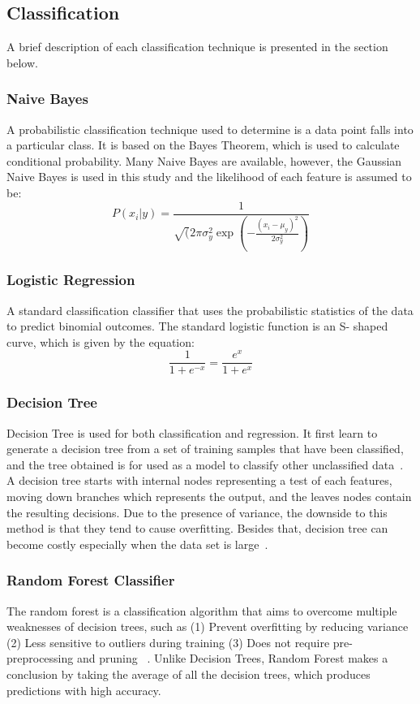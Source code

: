 \documentclass[conference]{IEEEtran}
\begin{document}
\subsection{Classification}
A brief description of each classification technique is presented in the section below.

\subsubsection{Naive Bayes}
A probabilistic classification technique used to determine is a data point falls into a particular class. It is based on the Bayes Theorem, which is used to calculate conditional probability. Many Naive Bayes are available, however, the Gaussian Naive Bayes is used in this study and the likelihood of each feature is assumed to be: 
\[
P(x_i|y) = \frac{1}{\sqrt(2\pi\sigma^2_y \exp(-\frac{(x_i-\mu_y)^2}{2\sigma^2_y})} 
\]

\subsubsection{Logistic Regression}
A standard classification classifier that uses the probabilistic statistics of the data to predict binomial outcomes. The standard logistic function is an S- shaped curve, which is given by the equation:
\[
\frac{1}{1 + e^{-x}} = \frac{e^x}{1+e^x}
\]

\subsubsection{Decision Tree}
Decision Tree is used for both classification and regression. It first learn to generate a decision tree from a set of training samples that have been classified, and the tree obtained is for used as a model to classify other unclassified data~\cite{lan2020comparative}. A decision tree starts with internal nodes representing a test of each features, moving down branches which represents the output, and the leaves nodes contain the resulting decisions. Due to the presence of variance, the downside to this method is that they tend to cause overfitting. Besides that, decision tree can become costly especially when the data set is large~\cite{ali2012random}.

\subsubsection{Random Forest Classifier}
The random forest is a classification algorithm that aims to overcome multiple weaknesses of decision trees, such as (1) Prevent overfitting by reducing variance (2) Less sensitive to outliers during training (3) Does not require pre-preprocessing and pruning ~\cite{ali2012random}. Unlike Decision Trees, Random Forest makes a conclusion by taking the average of all the decision trees, which produces predictions with high accuracy. 
\end{document}
